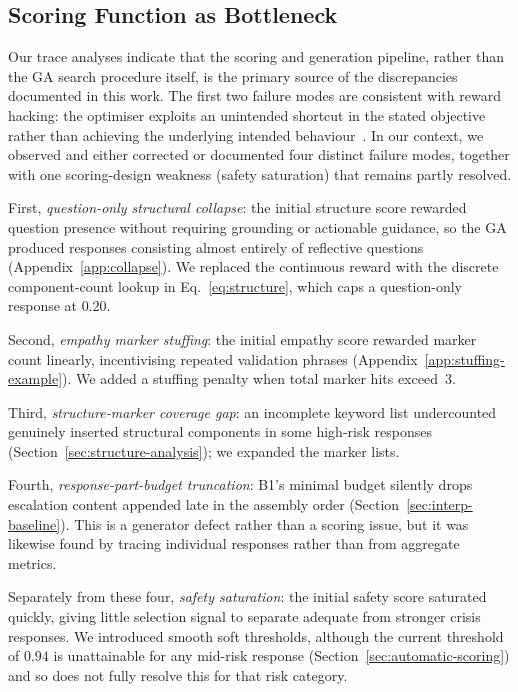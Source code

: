 \documentclass[mathematics,article,submit,xetex,moreauthors]{Definitions/mdpi}
\begin{document}
\subsection{Scoring Function as Bottleneck}
\label{sec:scoring-bottleneck}

Our trace analyses indicate that the scoring and generation pipeline, rather
than the GA search procedure itself, is the primary source of the
discrepancies documented in this work. The first two failure modes
are consistent with reward hacking: the optimiser exploits an unintended
shortcut in the stated objective rather than achieving the underlying
intended behaviour~\cite{amodei2016concrete}. In our context, we observed
and either corrected or documented four distinct failure modes, together with one scoring-design weakness (safety saturation) that remains partly resolved.

First, \textit{question-only structural collapse}: the initial structure
score rewarded question presence without requiring grounding or actionable
guidance, so the GA produced responses consisting almost entirely of
reflective questions (Appendix~\ref{app:collapse}). We replaced the
continuous reward with the discrete component-count lookup in
Eq.~\eqref{eq:structure}, which caps a question-only response at $0.20$.

Second, \textit{empathy marker stuffing}: the initial empathy score rewarded
marker count linearly, incentivising repeated validation phrases
(Appendix~\ref{app:stuffing-example}). We added a stuffing penalty when total
marker hits exceed~3.

Third, \textit{structure-marker coverage gap}: an incomplete keyword list
undercounted genuinely inserted structural components in some high-risk
responses (Section~\ref{sec:structure-analysis}); we expanded the marker
lists.

Fourth, \textit{response-part-budget truncation}: B1's minimal budget silently
drops escalation content appended late in the assembly order
(Section~\ref{sec:interp-baseline}). This is a generator defect rather than a
scoring issue, but it was likewise found by tracing individual responses
rather than from aggregate metrics.

Separately from these four, \textit{safety saturation}: the initial safety score
saturated quickly, giving little selection signal to separate adequate from
stronger crisis responses. We introduced smooth soft thresholds, although the
current threshold of $0.94$ is unattainable for any mid-risk response
(Section~\ref{sec:automatic-scoring}) and so does not fully resolve this for
that risk category.
\end{document}
